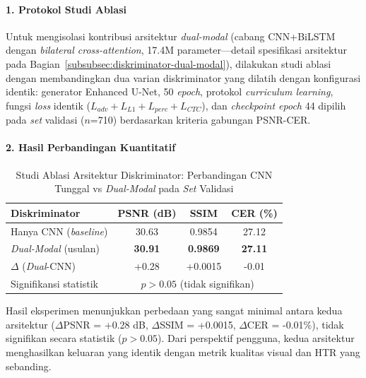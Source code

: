 \documentclass[12pt,a4paper]{article}
\begin{document}
\vspace{0.5em}

\paragraph{1. Protokol Studi Ablasi}

Untuk mengisolasi kontribusi arsitektur \textit{dual-modal} (cabang CNN+BiLSTM dengan \textit{bilateral cross-attention}, 17.4M parameter—detail spesifikasi arsitektur pada Bagian~\ref{subsubsec:diskriminator-dual-modal}), dilakukan studi ablasi dengan membandingkan dua varian diskriminator yang dilatih dengan konfigurasi identik: generator Enhanced U-Net, 50 \textit{epoch}, protokol \textit{curriculum learning}, fungsi \textit{loss} identik ($L_{adv} + L_{L1} + L_{perc} + L_{CTC}$), dan \textit{checkpoint epoch} 44 dipilih pada \textit{set} validasi ($n$=710) berdasarkan kriteria gabungan PSNR-CER.

\vspace{0.5em}

\paragraph{2. Hasil Perbandingan Kuantitatif}

\begin{table}[H]
\centering
\caption{Studi Ablasi Arsitektur Diskriminator: Perbandingan CNN Tunggal vs \textit{Dual-Modal} pada \textit{Set} Validasi}
\label{tab:diskriminator-ablasi}
\begin{tabular}{lccc}
\toprule
\textbf{Diskriminator} & \textbf{PSNR (dB)} & \textbf{SSIM} & \textbf{CER (\%)} \\
\midrule
Hanya CNN (\textit{baseline}) & 30.63 & 0.9854 & 27.12 \\
\textit{Dual-Modal} (usulan) & \textbf{30.91} & \textbf{0.9869} & \textbf{27.11} \\
\midrule
$\Delta$ (\textit{Dual}-CNN) & +0.28 & +0.0015 & -0.01 \\
Signifikansi statistik & \multicolumn{3}{c}{$p > 0.05$ (tidak signifikan)} \\
\bottomrule
\end{tabular}
\end{table}

Hasil eksperimen menunjukkan perbedaan yang sangat minimal antara kedua arsitektur ($\Delta$PSNR = +0.28 dB, $\Delta$SSIM = +0.0015, $\Delta$CER = -0.01\%), tidak signifikan secara statistik ($p > 0.05$). Dari perspektif pengguna, kedua arsitektur menghasilkan keluaran yang identik dengan metrik kualitas visual dan HTR yang sebanding.
\end{document}
